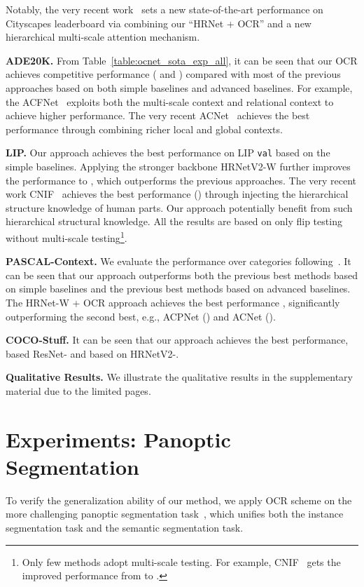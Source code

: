\documentclass[runningheads]{llncs}
\begin{document}
Notably, the very recent work~\cite{tao2020hierarchical} sets a new state-of-the-art performance  on Cityscapes leaderboard via combining our ``HRNet + OCR'' and a new hierarchical multi-scale attention mechanism.

\noindent\textbf{ADE20K.}
From Table~\ref{table:ocnet_sota_exp_all},
it can be seen that
our OCR achieves competitive performance ( and ) compared with most of the previous approaches
based on both simple baselines and advanced baselines.
For example, the ACFNet~\cite{he2019adaptive} exploits both the multi-scale context and relational context to achieve higher performance.
The very recent ACNet~\cite{Fu_2019_ICCV} achieves the best performance through combining richer local and global contexts.


\noindent\textbf{LIP.}
Our approach achieves the best performance 
 on LIP \texttt{val} based on the simple baselines.
Applying the stronger backbone HRNetV2-W further improves the performance
to , 
which outperforms the previous approaches.
The very recent work CNIF~\cite{Wang_2019_ICCV} achieves the best performance ()
through injecting the hierarchical structure knowledge of human parts.
Our approach potentially benefit from such hierarchical structural knowledge.
All the results are based on only flip testing without multi-scale testing\footnote{Only few methods adopt multi-scale testing. For example, 
CNIF~\cite{Wang_2019_ICCV}
gets the improved performance
from  to .}.

\noindent\textbf{PASCAL-Context.}
We evaluate the performance over  categories following~\cite{sun2019high}.
It can be seen that 
our approach outperforms both the previous best methods based on simple baselines and the previous best methods based on advanced baselines.
The HRNet-W + OCR approach achieves the best performance , 
significantly
outperforming the second best, e.g., ACPNet () and ACNet ().

\noindent\textbf{COCO-Stuff.}
It can be seen that 
our approach achieves the best performance,  based ResNet- and  based on HRNetV2-.


\noindent\textbf{Qualitative Results.}
We illustrate the qualitative results 
in the supplementary material due to the limited pages.

\section{Experiments: Panoptic Segmentation}

To verify the generalization ability of our method,
we apply OCR scheme on the more challenging panoptic segmentation task~\cite{kirillov2019panopticseg}, 
which unifies both the instance segmentation task and
the semantic segmentation task.
\end{document}

